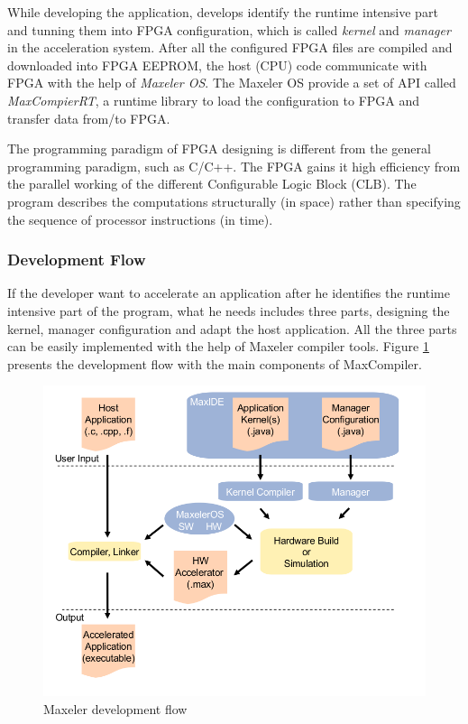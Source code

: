 While developing the application, develops identify the runtime intensive part
and tunning them into FPGA configuration, which is called \emph{kernel} and
\emph{manager} in the acceleration system. After all the configured FPGA
files are compiled and downloaded into FPGA EEPROM, the host (CPU) code
communicate with FPGA with the help of \emph{Maxeler OS}. The Maxeler OS
provide a set of API called \emph{MaxCompierRT}, a runtime library to load
the configuration to FPGA and transfer data from/to FPGA.

The programming paradigm of FPGA designing is different from the general
programming paradigm, such as C/C++. The FPGA gains it high efficiency from
the parallel working of the different Configurable Logic Block (CLB). The
program describes the computations structurally (in space) rather than
specifying the sequence of processor instructions (in
time)\cite{max_white_paper}.

\subsubsection{Development Flow}
If the developer want to accelerate an application after he identifies the
runtime intensive part of the program, what he needs includes three parts,
designing the kernel, manager configuration and adapt the host application.
All the three parts can be easily implemented with the help of Maxeler
compiler tools. Figure \ref{fig:development_flow} presents the development flow with the main
components of MaxCompiler.

\begin{figure}[h]
  \centering
  \includegraphics[scale=0.4]{img/development_flow.png}
  \caption{Maxeler development flow}
  \label{fig:development_flow}
\end{figure}

